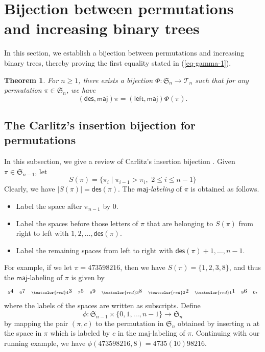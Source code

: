 \documentclass[12pt]{article}
\def\red{\textcolor{red}}
\numberwithin{equation}{section}
\def\red{\textcolor{red}}
\theoremstyle{plain}
\newtheorem{theorem}{Theorem}[section]
\def\des{\mathsf{des}}
\def\maj{\mathsf{maj}}
\def\l{\mathsf{left}}
\def\l{\mathsf{left}}
\def\B{\mathcal{T}}
\begin{document}
	 	
	 
	 	
	 	
	 	
	 	\section{Bijection between permutations and increasing binary trees}
	 	In this section, we establish  a bijection between   permutations and increasing
	 	binary trees, thereby proving the first equality  stated in (\ref{eq-gamma-1}).
	 	
	 	 \begin{theorem}\label{thm-Phi}
	 	 	For $n\geq 1$, there exists a bijection $\Phi: \mathfrak{S}_n\rightarrow \B_n$ such that for any permutation $\pi\in \mathfrak{S}_n$, we have
	 	 	$$
	 	 	(\des, \maj)\pi= (\l, \maj)\Phi(\pi).
	 	 	$$
	 	 	\end{theorem}
	 	
	 	\subsection{The Carlitz's  insertion  bijection  for permutations}
	 	 In this subsection, we give a review of Carlitz's insertion bijection \cite{Carlitz}.   Given $\pi\in \mathfrak{S}_{n-1}$, let 
	 	$$
	 	S(\pi)=\{\pi_{i}\mid \pi_{i-1}>\pi_i, \,\, 2\leq i\leq n-1\} 
	 	$$
	 	Clearly, we have $|S(\pi)|=\des(\pi)$. The {\em $\maj$-labeling} of $\pi$  is obtained as follows.
	 	\begin{itemize}
	 		\item Label the  space after $\pi_{n-1}$ by $0$.
	 		\item Label the spaces before those letters of $\pi$ that are belonging to $S(\pi)$ from right to left with $1,2,\ldots, \des(\pi)$. 
	 		\item Label the remaining spaces from left to right with $\des(\pi)+1,  \ldots, n-1$.
	 	\end{itemize}
	 	
	 	
	 	
	 	For example, if we   let    $\pi=473598216$,  then we have   $S(\pi)=\{1,2,3, 8 \}$,  and thus  the $\maj$-labeling of $\pi$ is given by
	 	$$
	 	\begin{array} {llllllllll}
	 		_{ 5}4&_67&_{\red 4} 3&_75&_89&_{\red3}8&_{\red2}2&_{\red 1}1&_96&_0,
	 	\end{array}
	 	$$
	 	where the labels of the spaces are written as subscripts. 
	 	Define $$\phi:\mathfrak{S}_{n-1}\times  \{0, 1, \ldots, n-1\} \longrightarrow \mathfrak{S}_{n}$$ by mapping the pair $( \pi, c)$ to the  permutation in $\mathfrak{S}_{n}$  obtained by inserting   $ n$ at the space in $\pi$ which  is labeled by $c$ in the $\mathrm{maj}$-labeling of $\pi$. Continuing with our running example, we have
	 	$\phi(473598216, 8)= 4735(10)98216$.
	 	
\end{document}
